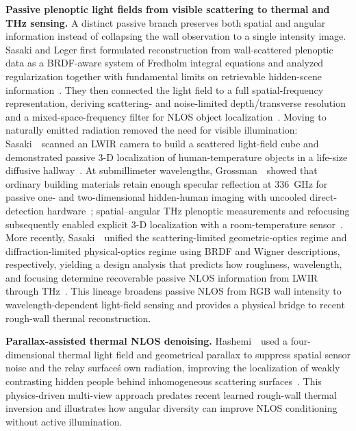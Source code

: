 \vspace{0.8mm}
\noindent \textbf{Passive plenoptic light fields from visible scattering to thermal and THz sensing.}
A distinct passive branch preserves both spatial and angular information instead of collapsing the wall observation to a single intensity image. Sasaki and Leger first formulated reconstruction from wall-scattered plenoptic data as a BRDF-aware system of Fredholm integral equations and analyzed regularization together with fundamental limits on retrievable hidden-scene information~\cite{sasakiPlenopticScatteredLight2020}. They then connected the light field to a full spatial-frequency representation, deriving scattering- and noise-limited depth/transverse resolution and a mixed-space-frequency filter for NLOS object localization~\cite{sasakiPlenopticNLOSLocation2021}. Moving to naturally emitted radiation removed the need for visible illumination: Sasaki~\etal~scanned an LWIR camera to build a scattered light-field cube and demonstrated passive 3-D localization of human-temperature objects in a life-size diffusive hallway~\cite{sasakiThermalIRPlenopticNLOS2021}. At submillimeter wavelengths, Grossman~\etal~showed that ordinary building materials retain enough specular reflection at 336~GHz for passive one- and two-dimensional hidden-human imaging with uncooled direct-detection hardware~\cite{grossmanPassiveTHzNLOS2022}; spatial--angular THz plenoptic measurements and refocusing subsequently enabled explicit 3-D localization with a room-temperature sensor~\cite{sasakiPassiveTHzPlenoptic2022}. More recently, Sasaki~\etal~unified the scattering-limited geometric-optics regime and diffraction-limited physical-optics regime using BRDF and Wigner descriptions, respectively, yielding a design analysis that predicts how roughness, wavelength, and focusing determine recoverable passive NLOS information from LWIR through THz~\cite{sasakiCombinedOpticsPassiveNLOS2025}. This lineage broadens passive NLOS from RGB wall intensity to wavelength-dependent light-field sensing and provides a physical bridge to recent rough-wall thermal reconstruction.

\vspace{0.8mm}
\noindent \textbf{Parallax-assisted thermal NLOS denoising.}
Hashemi~\etal~used a four-dimensional thermal light field and geometrical parallax to suppress spatial sensor noise and the relay surface\'s own radiation, improving the localization of weakly contrasting hidden people behind inhomogeneous scattering surfaces~\cite{hashemiParallaxThermalNLOS2023}. This physics-driven multi-view approach predates recent learned rough-wall thermal inversion and illustrates how angular diversity can improve NLOS conditioning without active illumination.

